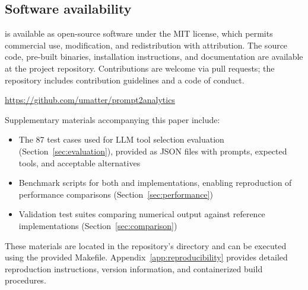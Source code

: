 \subsection{Software availability}

 is available as open-source software under the MIT
license, which permits commercial use, modification, and redistribution with
attribution. The source code, pre-built binaries, installation instructions,
and documentation are available at the project repository. Contributions are
welcome via pull requests; the repository includes contribution guidelines
and a code of conduct.

\begin{center}
\url{https://github.com/umatter/prompt2analytics}
\end{center}

\noindent Supplementary materials accompanying this paper include:
\begin{itemize}
  \item The 87 test cases used for LLM tool selection evaluation
    (Section~\ref{sec:evaluation}), provided as JSON files with prompts,
    expected tools, and acceptable alternatives
  \item Benchmark scripts for both  and 
    implementations, enabling reproduction of performance comparisons
    (Section~\ref{sec:performance})
  \item Validation test suites comparing numerical output against
     reference implementations (Section~\ref{sec:comparison})
\end{itemize}

\noindent These materials are located in the repository's 
directory and can be executed using the provided Makefile.
Appendix~\ref{app:reproducibility} provides detailed reproduction instructions,
version information, and containerized build procedures.

